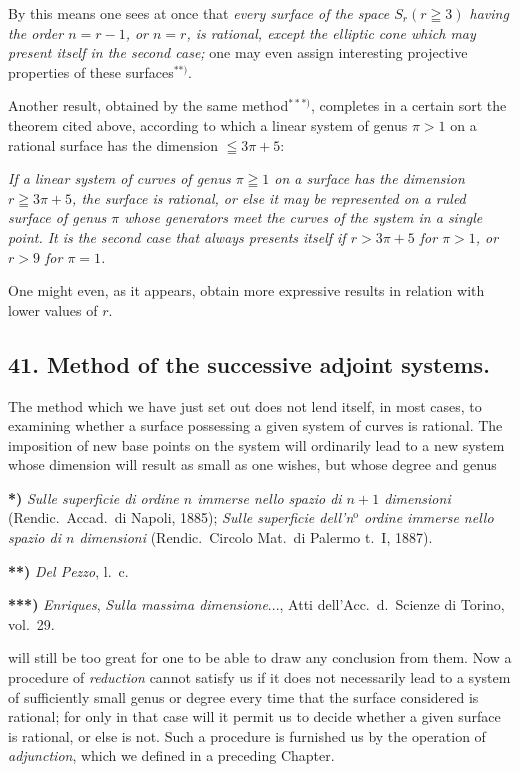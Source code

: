 \documentclass{article}
\begin{document}
By this means one sees at once that \emph{every surface of the space $S_{r}(r \geqq 3)$ having the order $n = r - 1$, or $n = r$, is rational, except the elliptic cone which may present itself in the second case;} one may even assign interesting projective properties of these surfaces${}^{**)}$.

Another result, obtained by the same method${}^{***)}$, completes in a certain sort the theorem cited above, according to which a linear system of genus $\pi > 1$ on a rational surface has the dimension $\leqq 3\pi + 5$:

\emph{If a linear system of curves of genus $\pi \geqq 1$ on a surface has the dimension $r \geqq 3\pi + 5$, the surface is rational, or else it may be represented on a ruled surface of genus $\pi$ whose generators meet the curves of the system in a single point. It is the second case that always presents itself if $r > 3\pi + 5$ for $\pi > 1$, or $r > 9$ for $\pi = 1$.}

One might even, as it appears, obtain more expressive results in relation with lower values of $r$.

\subsection*{41. Method of the successive adjoint systems.}

The method which we have just set out does not lend itself, in most cases, to examining whether a surface possessing a given system of curves is rational. The imposition of new base points on the system will ordinarily lead to a new system whose dimension will result as small as one wishes, but whose degree and genus

\textbf{*)} \emph{Sulle superficie di ordine $n$ immerse nello spazio di $n + 1$ dimensioni} (Rendic.\ Accad.\ di Napoli, 1885); \emph{Sulle superficie dell'n${}^{\text{o}}$ ordine immerse nello spazio di $n$ dimensioni} (Rendic.\ Circolo Mat.\ di Palermo t.\ I, 1887).

\textbf{**)} \emph{Del Pezzo}, l.\ c.

\textbf{***)} \emph{Enriques}, \emph{Sulla massima dimensione}..., Atti dell'Acc.\ d.\ Scienze di Torino, vol.\ 29.

will still be too great for one to be able to draw any conclusion from them. Now a procedure of \emph{reduction} cannot satisfy us if it does not necessarily lead to a system of sufficiently small genus or degree every time that the surface considered is rational; for only in that case will it permit us to decide whether a given surface is rational, or else is not. Such a procedure is furnished us by the operation of \emph{adjunction}, which we defined in a preceding Chapter.
\end{document}
